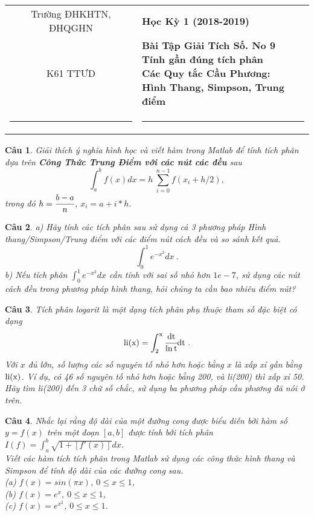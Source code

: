 \documentclass[11pt]{article}
\newtheorem{bt}{Câu}
\begin{document}
\begin{tabular*}
{\linewidth}{c>{\centering\hspace{0pt}} p{}}
Trường ĐHKHTN, ĐHQGHN & {\bf Học Kỳ 1 (2018-2019)}
\tabularnewline
K61 TTƯD & {\bf Bài Tập Giải Tích Số. No 9 \\ Tính gần đúng tích phân \\ Các Quy tắc Cầu Phương: \\ Hình Thang, Simpson, Trung điểm}
\tabularnewline
\rule{1in}{1pt}  \small  & \rule{2in}{1pt} %
\tabularnewline

\end{tabular*}
%

\begin{bt}
Giải thích ý nghĩa hình học và viết hàm trong Matlab để tính tích phân dựa trên \emph{\textbf{Công Thức Trung Điểm với các nút các đều}} sau
%
\[ \int_{a}^{b} f(x)dx = h \ \sum_{i=0}^{n-1} f(x_i + h/2), \]
%
trong đó $h=\cfrac{b-a}{n}$, $x_i = a+i*h$.
\end{bt}

\begin{bt}
a) Hãy tính các tích phân sau sử dụng cả 3 phương pháp \emph{Hình thang/Simpson/Trung điểm} với các điểm nút cách đều và so sánh kết quả. 
\[ \int_{0}^{1} e^{-x^2} dx \ . \]
%	
b) Nếu tích phân $\int_{0}^{1} e^{-x^2} dx$ cần tính với sai số nhỏ hơn $1e-7$, sử dụng các nút cách đều trong phương pháp hình thang, hỏi chúng ta cần bao nhiêu điểm nút?
\end{bt}

\begin{bt}
Tích phân logarit là một dạng tích phân phụ thuộc tham số đặc biệt có dạng 
%
\[ \rm{li}(x) = \int_{2}^{x} \cfrac{dt}{\ln t} dt  \ . \]
%
Với $x$ đủ lớn, số lượng các số nguyên tố nhỏ hơn hoặc bằng $x$ là xấp xỉ gần bằng $\rm{li}(x)$. Ví dụ, có 46 số nguyên tố nhỏ hơn hoặc bằng 200, và li(200) thì xấp xỉ 50. Hãy tìm 
li(200) đến 3 chữ số chắc, sử dụng ba phương pháp cầu phương đã nói ở trên.
\end{bt}

\begin{bt}
Nhắc lại rằng độ dài của một đường cong được biểu diễn bởi hàm số $y=f(x)$ trên một đoạn $[a,b]$ được tính bởi tích phân $I(f) = \int_{a}^{b} \sqrt{1+[f'(x)]} dx$.\\ 
Viết các hàm tích tích phân trong Matlab sử dụng các công thức hình thang và Simpson để tính độ dài của các đường cong sau. \\ 
(a) $f(x)=sin(\pi x)$, $0\leq x \leq 1$, \\ 
(b) $f(x)=e^x$, $0\leq x \leq 1$, \\ 
(c) $f(x)=e^{x^2}$, $0\leq x \leq 1$.	
\end{bt}
\end{document}

